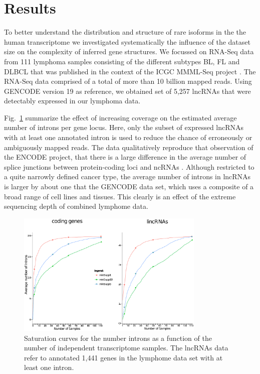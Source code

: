 \documentclass[ncrna,article,submit,moreauthors,pdftex,10pt,a4paper]{mdpi}
\begin{document}
\section{Results}

To better understand the distribution and structure of rare isoforms in the
the human transcriptome we investigated systematically the influence of the
dataset size on the complexity of inferred gene structures. We focussed on
RNA-Seq data from 111 lymphoma samples consisting of the different subtypes
BL, FL and DLBCL that was published in the context of the ICGC MMML-Seq
project \cite{Richter:12a}. The RNA-Seq data comprised of a total of more
than 10 billion mapped reads. Using GENCODE version 19 as reference, we
obtained set of 5,257 lncRNAs that were detectably expressed in our
lymphoma data.

Fig.~\ref{fig:saturation} summarize the effect of increasing coverage on
the estimated average number of introns per gene locus. Here, only the
subset of expressed lncRNAs with at least one annotated intron is used to
reduce the chance of erroneously or ambiguously mapped reads. The data
qualitatively reproduce that observation of the ENCODE project, that there
is a large difference in the average number of splice junctions between
protein-coding loci and ncRNAs \cite{Derrien:12}. Although restricted to a
quite narrowly defined cancer type, the average number of introns in
lncRNAs is larger by about one that the GENCODE data set, which uses a
composite of a broad range of cell lines and tissues. This clearly is an
effect of the extreme sequencing depth of combined lymphome data. 

\begin{figure}[t]
\begin{center}
  \includegraphics[width=0.8\textwidth]{saturation}
\end{center}
\caption{Saturation curves for the number introns as a function of the 
  number of independent transcriptome samples. The lncRNAs data refer to 
  annotated 1,441 genes in the lymphome data set with at least one intron. 
  }
  \label{fig:saturation} 
\end{figure}
\end{document}
